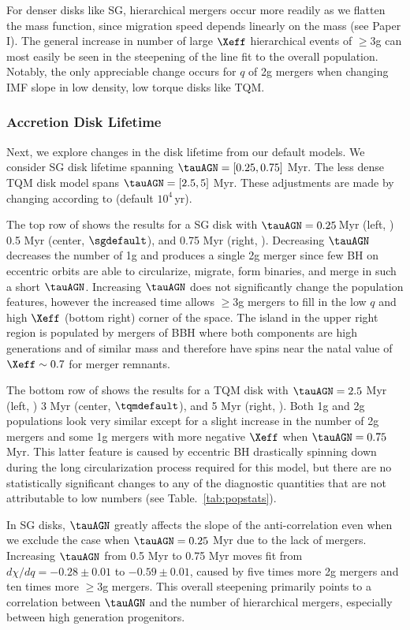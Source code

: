 For denser disks like SG, hierarchical mergers occur more readily as we flatten the mass function, since migration speed depends linearly on the mass (see Paper I).
The general increase in number of large $\Xeff$ hierarchical events of $\geq$3g can most easily be seen in the steepening of the line fit to the overall population.
Notably, the only appreciable change occurs for $q$ of 2g mergers when changing IMF slope in low density, low torque disks like TQM.


\subsubsection{Accretion Disk Lifetime}
Next, we explore changes in the disk lifetime from our default models.
We consider SG disk lifetime spanning $\tauAGN=[0.25,0.75]$ Myr.
The less dense TQM disk model spans $\tauAGN=[2.5,5]$ Myr.
These adjustments are made by changing  according to  (default $10^4\,$yr).

The top row of  shows the results for a SG disk with $\tauAGN=0.25\,$Myr (left, ) 0.5 Myr (center, $\sgdefault$), and 0.75 Myr (right, ).
Decreasing $\tauAGN$ decreases the number of 1g and produces a single 2g merger since few BH on eccentric orbits are able to circularize, migrate, form binaries, and merge in such a short $\tauAGN$.
Increasing $\tauAGN$ does not significantly change the population features, however the increased time allows $\geq$3g mergers to fill in the low $q$ and high $\Xeff$ (bottom right) corner of the space.
The island in the upper right region is populated by mergers of BBH where both components are high generations and of similar mass and therefore have spins near the natal value of $\Xeff \sim 0.7$ for merger remnants.

The bottom row of  shows the results for a TQM disk with $\tauAGN=2.5$ Myr (left, ) 3 Myr (center, $\tqmdefault$), and 5 Myr (right, ).
Both 1g and 2g populations look very similar except for a slight increase in the number of 2g mergers and some 1g mergers with more negative $\Xeff$ when $\tauAGN=0.75$ Myr.
This latter feature is caused by eccentric BH drastically spinning down during the long circularization process required for this model, but there are no statistically significant changes to any of the diagnostic quantities that are not attributable to low numbers (see Table.~\ref{tab:popstats}).

In SG disks, $\tauAGN$ greatly affects the slope of the anti-correlation even when we exclude the case when $\tauAGN=0.25$ Myr due to the lack of mergers.
Increasing $\tauAGN$ from 0.5 Myr to 0.75 Myr moves fit from $d\chi/dq=-0.28\pm0.01$ to $-0.59\pm0.01$, caused by five times more 2g mergers and ten times more $\geq$3g mergers.
This overall steepening primarily points to a correlation between $\tauAGN$ and the number of hierarchical mergers, especially between high generation progenitors.


